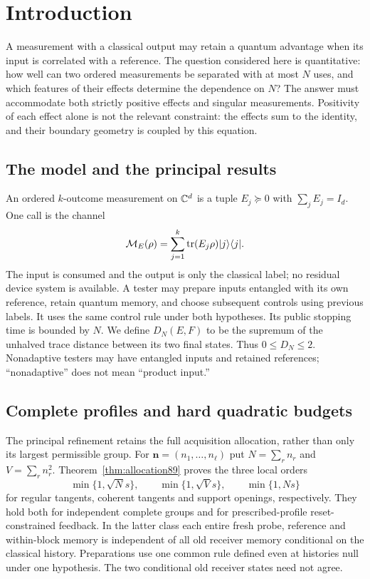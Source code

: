 \section{Introduction}\label{sec:introduction84}
A measurement with a classical output may retain a quantum advantage
when its input is correlated with a reference.  The question considered
here is quantitative: how well can two ordered measurements be
separated with at most $N$ uses, and which features of their effects
determine the dependence on $N$?  The answer must accommodate both
strictly positive effects and singular measurements.  Positivity of
each effect alone is not the relevant constraint: the effects sum to
the identity, and their boundary geometry is coupled by this equation.

\subsection{The model and the principal results}
An ordered $k$-outcome measurement on $\mathbb C^d$ is a tuple
$E_j\succeq0$ with $\sum_jE_j=I_d$.  One call is the channel
\[
 \mathcal M_E(\rho)=\sum_{j=1}^k\operatorname{tr}(E_j\rho)|j\rangle\langle j|.
\]
The input is consumed and the output is only the classical label;
no residual device system is available.  A tester may prepare inputs
entangled with its own reference, retain quantum memory, and choose
subsequent controls using previous labels.  It uses the same control
rule under both hypotheses.  Its public stopping time is bounded
by $N$.  We define $D_N(E,F)$ to be the supremum of the unhalved
trace distance between its two final states.  Thus $0\le D_N\le2$.
Nonadaptive testers may have entangled inputs and retained references;
``nonadaptive'' does not mean ``product input.''


\subsection{Complete profiles and hard quadratic budgets}
The principal refinement retains the full acquisition allocation,
rather than only its largest permissible group.  For
$\boldsymbol n=(n_1,\ldots,n_\ell)$ put
$N=\sum_r n_r$ and $V=\sum_r n_r^2$.
Theorem~\ref{thm:allocation89} proves the three local orders
\begin{equation}\label{eq:frontprofile89}
 \min\{1,\sqrt N s\},\qquad
 \min\{1,\sqrt V s\},\qquad
 \min\{1,Ns\}
\end{equation}
for regular tangents, coherent tangents and support openings,
respectively.  They hold both for independent complete groups and
for prescribed-profile reset-constrained feedback.  In the latter
class each entire fresh probe, reference and within-block memory
is independent of all old receiver memory conditional on the
classical history.  Preparations use one common rule defined even
at histories null under one hypothesis.  The two conditional old
receiver states need not agree.


